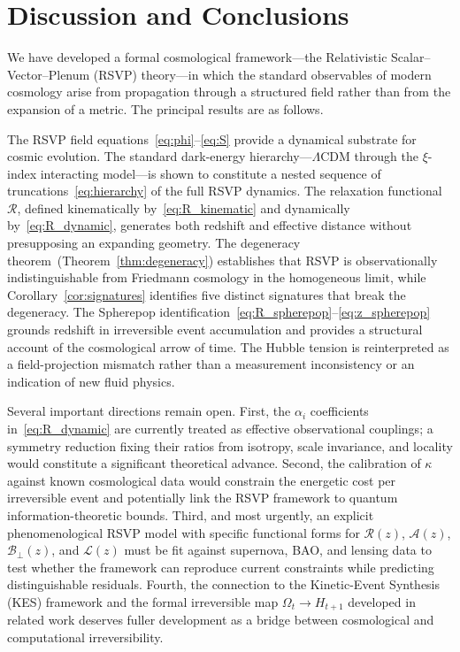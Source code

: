 \documentclass[12pt,a4paper]{article}
\theoremstyle{remark}
\newcommand{\Rcal}{\mathcal{R}}
\newcommand{\Acal}{\mathcal{A}}
\newcommand{\Bcal}{\mathcal{B}}
\begin{document}
\section{Discussion and Conclusions}
\label{sec:conclusion}

We have developed a formal cosmological framework---the Relativistic Scalar--Vector--Plenum (RSVP) theory---in which the standard observables of modern cosmology arise from propagation through a structured field rather than from the expansion of a metric. The principal results are as follows.

The RSVP field equations~\eqref{eq:phi}--\eqref{eq:S} provide a dynamical substrate for cosmic evolution. The standard dark-energy hierarchy---$\Lambda$CDM through the $\xi$-index interacting model---is shown to constitute a nested sequence of truncations~\eqref{eq:hierarchy} of the full RSVP dynamics. The relaxation functional $\Rcal$, defined kinematically by~\eqref{eq:R_kinematic} and dynamically by~\eqref{eq:R_dynamic}, generates both redshift and effective distance without presupposing an expanding geometry. The degeneracy theorem~(Theorem~\ref{thm:degeneracy}) establishes that RSVP is observationally indistinguishable from Friedmann cosmology in the homogeneous limit, while Corollary~\ref{cor:signatures} identifies five distinct signatures that break the degeneracy. The Spherepop identification~\eqref{eq:R_spherepop}--\eqref{eq:z_spherepop} grounds redshift in irreversible event accumulation and provides a structural account of the cosmological arrow of time. The Hubble tension is reinterpreted as a field-projection mismatch rather than a measurement inconsistency or an indication of new fluid physics.

Several important directions remain open. First, the $\alpha_i$ coefficients in~\eqref{eq:R_dynamic} are currently treated as effective observational couplings; a symmetry reduction fixing their ratios from isotropy, scale invariance, and locality would constitute a significant theoretical advance. Second, the calibration of $\kappa$ against known cosmological data would constrain the energetic cost per irreversible event and potentially link the RSVP framework to quantum information-theoretic bounds. Third, and most urgently, an explicit phenomenological RSVP model with specific functional forms for $\Rcal(z)$, $\Acal(z)$, $\Bcal_\perp(z)$, and $\mathcal{L}(z)$ must be fit against supernova, BAO, and lensing data to test whether the framework can reproduce current constraints while predicting distinguishable residuals. Fourth, the connection to the Kinetic-Event Synthesis (KES) framework and the formal irreversible map $\Omega_t \to H_{t+1}$ developed in related work deserves fuller development as a bridge between cosmological and computational irreversibility.
\end{document}

